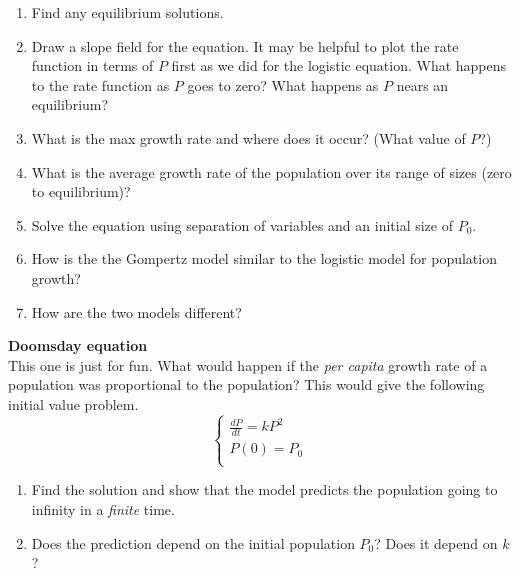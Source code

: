 \documentclass[11pt]{article}
\begin{document}
\begin{enumerate}
\item{Find any equilibrium solutions.}

\item{Draw a slope field for the equation.  It may be helpful to plot the rate function in terms of $P$ first as we did for the logistic equation.  What happens to the rate function as $P$ goes to zero?  What happens as $P$ nears an equilibrium?}

\item{What is the max growth rate and where does it occur? (What value of $P$?) }

\item{What is the average growth rate of the population over its range of sizes (zero to equilibrium)? }

\item{Solve the equation using separation of variables and an initial size of $P_0$.}

\item{How is the the Gompertz model similar to the logistic model for population growth?}

\item{How are the two models different?}

\end{enumerate}


\pagebreak
    {\bf Doomsday equation}\\
    This one is just for fun.  What would happen if the \emph{per capita} growth rate of a population
    was proportional to the population?   This would give the following initial value problem.
\begin{displaymath}
  \left\{ \begin{array}{ll}
 \frac{dP}{dt} = kP^2\\
P(0) = P_0 \\
\end{array} \right.
\end{displaymath}
\begin{enumerate}
\item{Find the solution and show that the model predicts the population going to infinity in a \emph{finite} time.}
\item{Does the prediction depend on the initial population $P_0$?  Does it depend on $k$?}
\end{enumerate}
\end{document}
